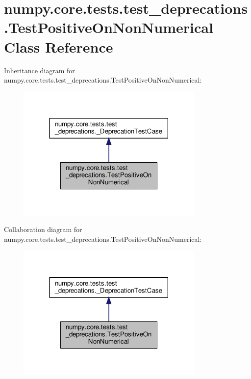 \hypertarget{classnumpy_1_1core_1_1tests_1_1test__deprecations_1_1TestPositiveOnNonNumerical}{}\section{numpy.\+core.\+tests.\+test\+\_\+deprecations.\+Test\+Positive\+On\+Non\+Numerical Class Reference}
\label{classnumpy_1_1core_1_1tests_1_1test__deprecations_1_1TestPositiveOnNonNumerical}


Inheritance diagram for numpy.\+core.\+tests.\+test\+\_\+deprecations.\+Test\+Positive\+On\+Non\+Numerical\+:
\nopagebreak
\begin{figure}[H]
\begin{center}
\leavevmode
\includegraphics[width=261pt]{classnumpy_1_1core_1_1tests_1_1test__deprecations_1_1TestPositiveOnNonNumerical__inherit__graph}
\end{center}
\end{figure}


Collaboration diagram for numpy.\+core.\+tests.\+test\+\_\+deprecations.\+Test\+Positive\+On\+Non\+Numerical\+:
\nopagebreak
\begin{figure}[H]
\begin{center}
\leavevmode
\includegraphics[width=261pt]{classnumpy_1_1core_1_1tests_1_1test__deprecations_1_1TestPositiveOnNonNumerical__coll__graph}
\end{center}
\end{figure}

